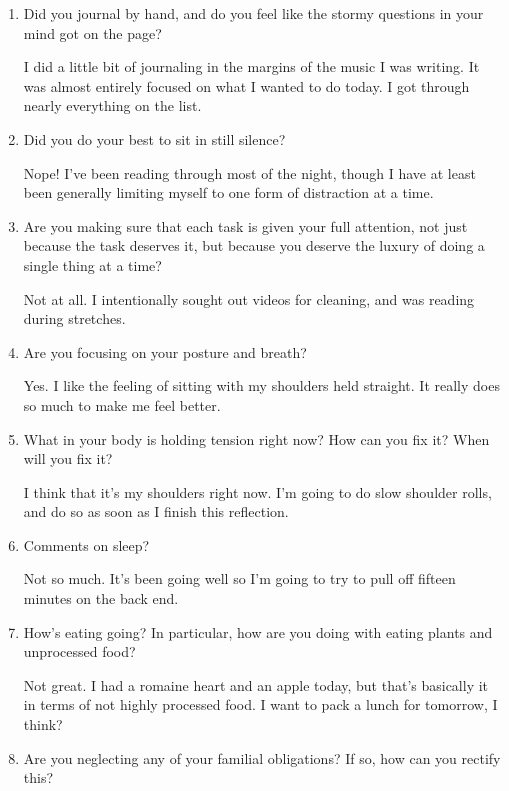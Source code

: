 \documentclass[12pt]{article}
\renewcommand{\,}{\textsuperscript{,}}
\begin{document}
\begin{enumerate}

\item Did you journal by hand, and do you feel like the stormy questions in your mind got on the page?

I did a little bit of journaling in the margins of the music I was writing.  
It was almost entirely focused on what I wanted to do today.  
I got through nearly everything on the list.

\item Did you do your best to sit in still silence?

Nope! I've been reading through most of the night, though I have at least been generally limiting myself to one form of distraction at a time.

\item Are you making sure that each task is given your full attention, not just because the task deserves it, but because you deserve the luxury of doing a single thing at a time?

Not at all.  
I intentionally sought out videos for cleaning, and was reading during stretches.

\item Are you focusing on your posture and breath?

Yes. I like the feeling of sitting with my shoulders held straight. It really does so much to make me feel better.

\item What in your body is holding tension right now? How can you fix it? When will you fix it?

I think that it's my shoulders right now. I'm going to do slow shoulder rolls, and do so as soon as I finish this reflection.

\item Comments on sleep?

Not so much. It's been going well so I'm going to try to pull off fifteen minutes on the back end.

\item How's eating going? In particular, how are you doing with eating plants and unprocessed food?

Not great. I had a romaine heart and an apple today, but that's basically it in terms of not highly processed food.  
I want to pack a lunch for tomorrow, I think?

\item Are you neglecting any of your familial obligations? If so, how can you rectify this?


\end{enumerate}
\end{document}

